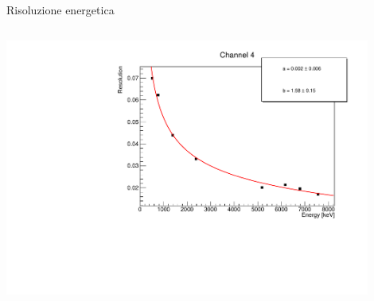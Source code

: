 \documentclass [xcolor=svgnames] {beamer}
\begin{document}
\begin{frame}{Risoluzione energetica}
\begin{columns}
\begin{column}{0.5\textwidth}
{				\includegraphics[width=0.9\textwidth]{img/ResGraph_4.pdf}}
		\end{column}
	\end{columns}
\end{frame}
\end{document}
